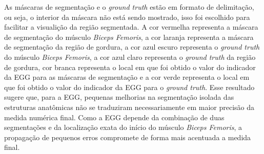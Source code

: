 As máscaras de segmentação e o \textit{ground truth} estão em formato de delimitação, ou seja, o interior da máscara não está sendo mostrado, isso foi escolhido para facilitar a visualição da região segmentada. A cor vermelha representa a máscara de segmentação do músculo \textit{Biceps Femoris}, a cor laranja representa a máscara de segmentação da região de gordura, a cor azul escuro representa o \textit{ground truth} do músculo \textit{Biceps Femoris}, a cor azul claro representa o \textit{ground truth} da região de gordura, cor branca representa o local em que foi obtido o valor do indicador da EGG para as máscaras de segmentação e a cor verde representa o local em que foi obtido o valor do indicador da EGG para o \textit{ground truth}. Esse resultado sugere que, para a EGG, pequenas melhorias na segmentação isolada das estruturas anatômicas não se traduziram necessariamente em maior precisão da medida numérica final. Como a EGG depende da combinação de duas segmentações e da localização exata do início do músculo \textit{Biceps Femoris}, a propagação de pequenos erros compromete de forma mais acentuada a medida final. 
